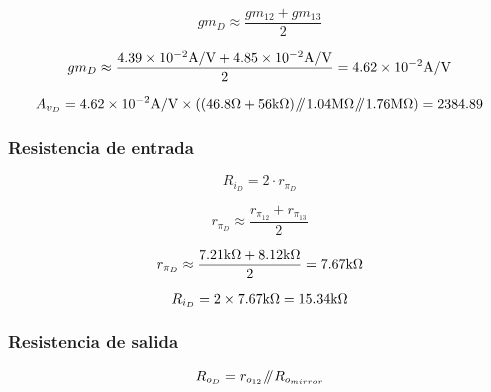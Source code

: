 \begin{equation}
gm_{D} \approx \frac{gm_{12} + gm_{13}}{2}
\end{equation}


\begin{equation*}
gm_{D} \approx \frac{\num{4.39E-2} \si[per-mode=symbol]{\ampere\per\volt} + \num{4.85E-2} \si[per-mode=symbol]{\ampere\per\volt}}{2} = \num{4.62e-2} \si[per-mode=symbol]{\ampere\per\volt}
\end{equation*}


\begin{equation*}
A_{v_{D}} = \num{4.62e-2} \si[per-mode=symbol]{\ampere\per\volt} \times \left( \left( 46.8 \si[per-mode=symbol]{\ohm}  + 56 \si[per-mode=symbol]{\kilo\ohm} \right) \parallelresistors 1.04 \si[per-mode=symbol]{\mega\ohm} \parallelresistors 1.76 \si[per-mode=symbol]{\mega\ohm}  \right) = 2384.89
\end{equation*}

\subsubsection{Resistencia de entrada}

\begin{equation}
R_{i_{D}} = 2 \cdot r_{\pi_{D}}
\end{equation}

\begin{equation}
r_{\pi_{D}} \approx \frac{r_{\pi_{12}} + r_{\pi_{13}}}{2}
\end{equation}

\begin{equation*}
r_{\pi_{D}} \approx \frac{7.21 \si[per-mode=symbol]{\kilo\ohm} + 8.12 \si[per-mode=symbol]{\kilo\ohm}}{2} = 7.67 \si[per-mode=symbol]{\kilo\ohm}
\end{equation*}

\begin{equation*}
R_{i_{D}} = 2 \times 7.67 \si[per-mode=symbol]{\kilo\ohm} = 15.34 \si[per-mode=symbol]{\kilo\ohm}
\end{equation*}



\subsubsection{Resistencia de salida}

\begin{equation}
R_{o_{D}} = r_{o_{12}} \parallelresistors R_{o_{mirror}}
\end{equation}


